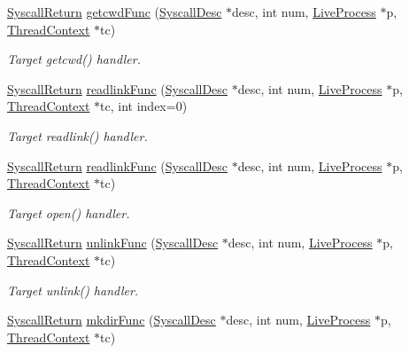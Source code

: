 \begin{DoxyCompactItemize}
\hyperlink{classSyscallReturn}{SyscallReturn} \hyperlink{syscall__emul_8hh_ae2dad23a33eba280d86c2592fcd93fe9}{getcwdFunc} (\hyperlink{classSyscallDesc}{SyscallDesc} $\ast$desc, int num, \hyperlink{classLiveProcess}{LiveProcess} $\ast$p, \hyperlink{classThreadContext}{ThreadContext} $\ast$tc)
\begin{DoxyCompactList}\small\item\em Target getcwd() handler. \item\end{DoxyCompactList}\item 
\hyperlink{classSyscallReturn}{SyscallReturn} \hyperlink{syscall__emul_8hh_a713e8bc427660dda08453f913ee48c21}{readlinkFunc} (\hyperlink{classSyscallDesc}{SyscallDesc} $\ast$desc, int num, \hyperlink{classLiveProcess}{LiveProcess} $\ast$p, \hyperlink{classThreadContext}{ThreadContext} $\ast$tc, int index=0)
\begin{DoxyCompactList}\small\item\em Target readlink() handler. \item\end{DoxyCompactList}\item 
\hyperlink{classSyscallReturn}{SyscallReturn} \hyperlink{syscall__emul_8hh_ad3f837adc09d39f3de515a223236040e}{readlinkFunc} (\hyperlink{classSyscallDesc}{SyscallDesc} $\ast$desc, int num, \hyperlink{classLiveProcess}{LiveProcess} $\ast$p, \hyperlink{classThreadContext}{ThreadContext} $\ast$tc)
\begin{DoxyCompactList}\small\item\em Target open() handler. \item\end{DoxyCompactList}\item 
\hyperlink{classSyscallReturn}{SyscallReturn} \hyperlink{syscall__emul_8hh_a332ee720b2d3c8f128b10627f87a9a67}{unlinkFunc} (\hyperlink{classSyscallDesc}{SyscallDesc} $\ast$desc, int num, \hyperlink{classLiveProcess}{LiveProcess} $\ast$p, \hyperlink{classThreadContext}{ThreadContext} $\ast$tc)
\begin{DoxyCompactList}\small\item\em Target unlink() handler. \item\end{DoxyCompactList}\item 
\hyperlink{classSyscallReturn}{SyscallReturn} \hyperlink{syscall__emul_8hh_aeada7d30dbed17e022348fdce3bdebc6}{mkdirFunc} (\hyperlink{classSyscallDesc}{SyscallDesc} $\ast$desc, int num, \hyperlink{classLiveProcess}{LiveProcess} $\ast$p, \hyperlink{classThreadContext}{ThreadContext} $\ast$tc)

\end{DoxyCompactItemize}
